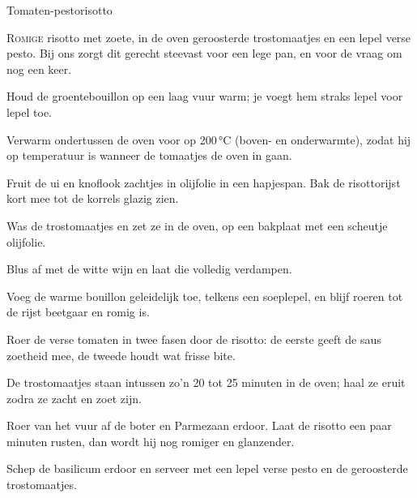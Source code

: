 \begin{recipe}{Tomaten-pestorisotto}


\lettrine{R}{omige} risotto met zoete, in de oven geroosterde trostomaatjes en
een lepel verse pesto. Bij ons zorgt dit gerecht steevast voor een lege pan,
en voor de vraag om nog een keer.

\begin{ingredients}
\end{ingredients}

\begin{steps}
  \item Houd de groentebouillon op een laag vuur warm; je voegt hem straks lepel
        voor lepel toe.
  \item Verwarm ondertussen de oven voor op 200\,°C (boven- en onderwarmte), zodat 
        hij op temperatuur is wanneer de tomaatjes de oven in gaan.
  \item Fruit de ui en knoflook zachtjes in olijfolie in een hapjespan. Bak de
        risottorijst kort mee tot de korrels glazig zien. 
  \item Was de trostomaatjes en zet ze in de oven, op een bakplaat met een scheutje olijfolie.
  \item Blus af met de witte wijn en laat die volledig verdampen.
  \item Voeg de warme bouillon geleidelijk toe, telkens een soeplepel, en blijf
        roeren tot de rijst beetgaar en romig is.
  \item Roer de verse tomaten in twee fasen door de risotto: de eerste geeft de
        saus zoetheid mee, de tweede houdt wat frisse bite.
  \item De trostomaatjes staan intussen zo'n 20 tot 25 minuten in de oven;
        haal ze eruit zodra ze zacht en zoet zijn.
  \item Roer van het vuur af de boter en Parmezaan erdoor. Laat de risotto een
        paar minuten rusten, dan wordt hij nog romiger en glanzender.
  \item Schep de basilicum erdoor en serveer met een lepel verse pesto en de
        geroosterde trostomaatjes.
\end{steps}


\end{recipe}

